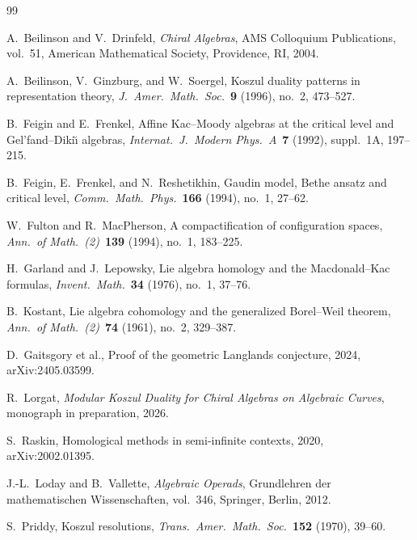 \documentclass[11pt]{article}
\theoremstyle{plain}
\theoremstyle{definition}
\theoremstyle{remark}
\numberwithin{equation}{section}
\begin{document}
\begin{thebibliography}{99}

A.~Beilinson and V.~Drinfeld,
\emph{Chiral Algebras},
AMS Colloquium Publications, vol.~51,
American Mathematical Society, Providence, RI, 2004.

A.~Beilinson, V.~Ginzburg, and W.~Soergel,
Koszul duality patterns in representation theory,
\emph{J.~Amer.\ Math.\ Soc.}~\textbf{9} (1996), no.~2, 473--527.

B.~Feigin and E.~Frenkel,
Affine Kac--Moody algebras at the critical level and
Gel'fand--Diki\u{\i} algebras,
\emph{Internat.\ J.\ Modern Phys.\ A}~\textbf{7}
(1992), suppl.~1A, 197--215.

B.~Feigin, E.~Frenkel, and N.~Reshetikhin,
Gaudin model, Bethe ansatz and critical level,
\emph{Comm.\ Math.\ Phys.}~\textbf{166} (1994), no.~1, 27--62.

W.~Fulton and R.~MacPherson,
A compactification of configuration spaces,
\emph{Ann.\ of Math.~(2)}~\textbf{139} (1994), no.~1, 183--225.

H.~Garland and J.~Lepowsky,
Lie algebra homology and the Macdonald--Kac formulas,
\emph{Invent.\ Math.}~\textbf{34} (1976), no.~1, 37--76.

B.~Kostant,
Lie algebra cohomology and the generalized Borel--Weil theorem,
\emph{Ann.\ of Math.~(2)}~\textbf{74} (1961), no.~2, 329--387.

D.~Gaitsgory et al.,
Proof of the geometric Langlands conjecture,
2024, arXiv:2405.03599.

R.~Lorgat,
\emph{Modular Koszul Duality for Chiral Algebras on Algebraic
Curves},
monograph in preparation, 2026.

S.~Raskin,
Homological methods in semi-infinite contexts,
2020, arXiv:2002.01395.

J.-L.~Loday and B.~Vallette,
\emph{Algebraic Operads},
Grundlehren der mathematischen Wissenschaften, vol.~346,
Springer, Berlin, 2012.

S.~Priddy,
Koszul resolutions,
\emph{Trans.\ Amer.\ Math.\ Soc.}~\textbf{152} (1970),
39--60.

\end{thebibliography}
\end{document}
